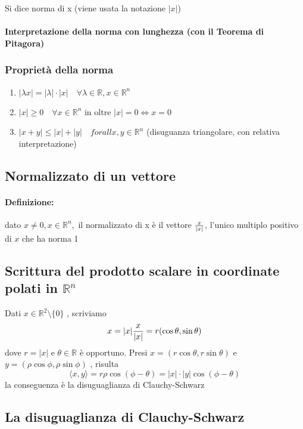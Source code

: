 \documentclass[a4paper]{article}
\newcommand {\R}{\mathbb{R}}
\begin{document}
Si dice norma di x (viene usata la notazione $|x|$)

\paragraph { Interpretazione della norma con lunghezza (con il Teorema di Pitagora) }

\subsubsection{Proprietà della norma}

\begin{enumerate}
	\item $ | \lambda x | = | \lambda | \cdot | x | \quad \forall \lambda \in \R , x \in \R ^ n $
	\item $ | x | \ge 0 \quad \forall x \in \R ^ n $ in oltre $ | x| =0 \iff x=0 $
	\item $ | x+y | \le |x| + |y| \quad forall x,y \in \R ^n$ (disuguanza triangolare, con relativa interpretazione)
\end{enumerate}

\subsection {Normalizzato di un vettore}
\paragraph{ Definizione: } dato $x \neq 0, x \in \R ^n, $ il normalizzato di x è il vettore $ x \over | x | $, l'unico multiplo positivo di $x$ che ha norma 1

\subsection{ Scrittura del prodotto scalare in coordinate polati in $ \R ^ n $}
Dati $ x \in \R ^ 2 \setminus \{ 0 \} $ , scriviamo 
$$
x= | x | { x \over |x| } = r ( \cos \theta , \sin \theta )
$$
dove $r=|x|$ e $\theta \in \R$ è opportuno. Presi $x = ( r \cos \theta, r \sin \theta)$ e $y=( \rho \cos \phi , \rho \sin \phi )$ , risulta
$$
\langle x,y \rangle = r \rho \cos ( \phi - \theta ) = |x| \cdot |y| \cos ( \phi - \theta ) 
$$
la conseguenza è la disuguaglianza di Clauchy-Schwarz

\subsection{ La disuguaglianza di Clauchy-Schwarz}
\end{document}

